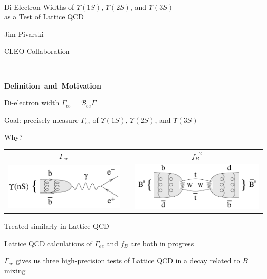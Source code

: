 \documentclass[landscape]{article}
\newenvironment{slide}[1][ ]{\mbox{\bf #1 } \vfill}{\vfill \mbox{ } \pagebreak}
\begin{document}
\huge \sf \boldmath
\renewcommand{\labelitemi}{-}
\setlength{\parindent}{0 cm}

\begin{slide}
  \begin{center}
    \Huge Di-Electron Widths of $\Upsilon(1S)$, $\Upsilon(2S)$, and $\Upsilon(3S)$ \\
    as a Test of Lattice QCD

    \vspace{2 cm}
    Jim Pivarski

    \vspace{1 cm}
    CLEO Collaboration
  \end{center}
\end{slide}

\begin{slide}[Definition and Motivation]

Di-electron width $\Gamma_{ee} = \mathcal{B}_{ee} \Gamma$

\vfill

Goal: precisely measure $\Gamma_{ee}$ of $\Upsilon(1S)$,
$\Upsilon(2S)$, and $\Upsilon(3S)$

\vfill

Why?

\begin{center}
  \begin{center}
    \begin{tabular}{c p{1 cm} c}
      $\Gamma_{ee}$ & & ${f_B}^2$ \\
      \includegraphics[width=0.4\linewidth]{diagram_gamee2} & &
      \includegraphics[width=0.4\linewidth]{diagram_bmixing}
    \end{tabular}
  \end{center}

  \vspace{0.5 cm}
  Treated similarly in Lattice QCD

\end{center}

\vfill

Lattice QCD calculations of $\Gamma_{ee}$ and $f_B$ are both in progress

\vfill

$\Gamma_{ee}$ gives us three high-precision tests of Lattice QCD in a
decay related to $B$ mixing

\end{slide}
\end{document}
